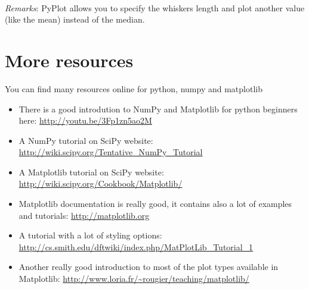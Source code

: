 \documentclass[article,10pt]{scrartcl}
\begin{document}
\paragraph{}
\emph{Remarks}: PyPlot allows you to specify the whiskers length and plot another value (like the mean) instead of the median.

\section{More resources}
You can find many resources online for python, numpy and matplotlib
\begin{itemize}
\item There is a good introdution to NumPy and Matplotlib for python beginners here: \url{http://youtu.be/3Fp1zn5ao2M}
\item A NumPy tutorial on SciPy website: \url{http://wiki.scipy.org/Tentative_NumPy_Tutorial}
\item A Matplotlib tutorial on SciPy website: \url{http://wiki.scipy.org/Cookbook/Matplotlib/}
\item Matplotlib documentation is really good, it contains also a lot of examples and tutorials: \url{http://matplotlib.org}
\item A tutorial with a lot of styling options: \url{http://cs.smith.edu/dftwiki/index.php/MatPlotLib_Tutorial_1}
\item Another really good introduction to most of the plot types available in Matplotlib: \url{http://www.loria.fr/~rougier/teaching/matplotlib/}
\end{itemize}
\end{document}
